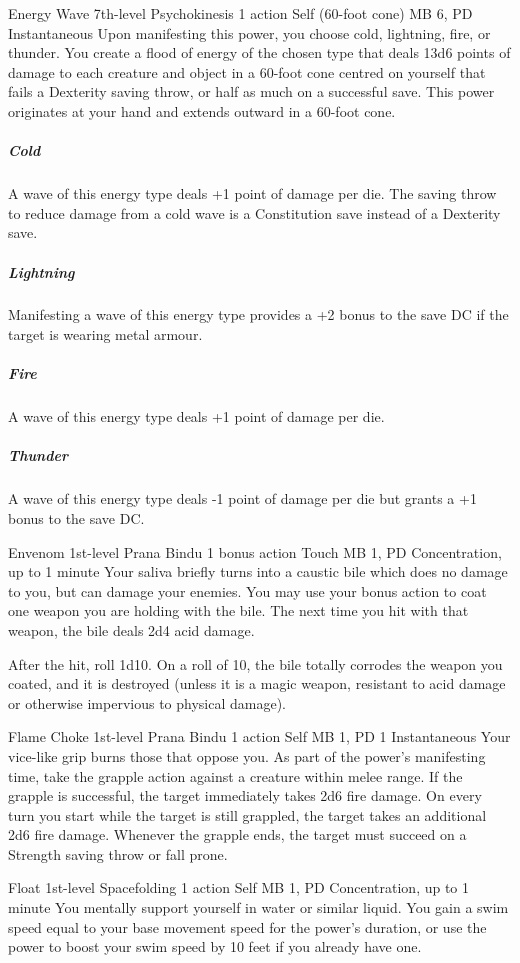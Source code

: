 \DndPowerHeader%
  {Energy Wave}
  {7th-level Psychokinesis}
  {1 action}
  {Self (60-foot cone)}
  {MB 6, PD \lvlseven}
  {Instantaneous}
Upon manifesting this power,
you choose cold, lightning, fire, or thunder.
You create a flood of energy of the chosen type
that deals 13d6 points of damage
to each creature and object in a 60-foot cone
centred on yourself
that fails a Dexterity saving throw,
or half as much on a successful save.
This power originates at your hand
and extends outward in a 60-foot cone.
\subparagraph{Cold}
A wave of this energy type deals +1 point
of damage per die.
The saving throw to reduce damage from a cold wave
is a Constitution save instead of a Dexterity save.  
\subparagraph{Lightning}
Manifesting a wave of this energy type
provides a +2 bonus to the save DC if the target is wearing
metal armour.
\subparagraph{Fire}
A wave of this energy type deals +1 point of damage per die.
\subparagraph{Thunder}
A wave of this energy type deals -1 point of damage per die
but grants a +1 bonus to the save DC.

\DndPowerHeader%
  {Envenom}
  {1st-level Prana Bindu}
  {1 bonus action}
  {Touch}
  {MB 1, PD \lvlone}
  {Concentration, up to 1 minute}
Your saliva briefly turns into a caustic bile
which does no damage to you,
but can damage your enemies.
You may use your bonus action to coat one weapon
you are holding with the bile.
The next time you hit with that weapon,
the bile deals 2d4 acid damage.

After the hit, roll 1d10.
On a roll of 10,
the bile totally corrodes the weapon you coated,
and it is destroyed
(unless it is a magic weapon, resistant to acid damage
or otherwise impervious to physical damage).

\DndPowerHeader%
  {Flame Choke}
  {1st-level Prana Bindu}
  {1 action}
  {Self}
  {MB 1, PD 1}
  {Instantaneous}
Your vice-like grip burns those that oppose you.
As part of the power's manifesting time,
take the grapple action against a creature within melee range.
If the grapple is successful,
the target immediately takes 2d6 fire damage.
On every turn you start while the target is still grappled,
the target takes an additional 2d6 fire damage.
Whenever the grapple ends,
the target must succeed on a Strength saving throw
or fall prone.

\DndPowerHeader%
  {Float}
  {1st-level Spacefolding}
  {1 action}
  {Self}
  {MB 1, PD \lvlone}
  {Concentration, up to 1 minute}
You mentally support yourself in water or similar liquid.
You gain a swim speed equal to your base movement speed for
the power's duration,
or use the power to boost your swim speed by 10 feet
if you already have one.

